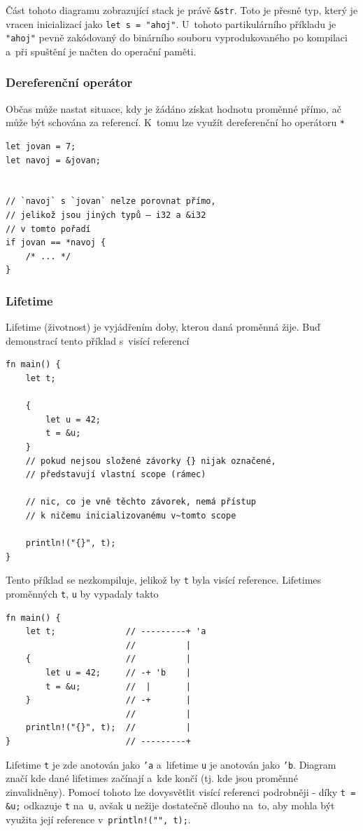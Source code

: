 \documentclass[a4paper, 12pt, twoside]{article} %
\newcommand{\rust}[1]{\texttt{#1}}
\begin{document}
				Část tohoto diagramu zobrazující stack je právě \rust{&str}. Toto je přesně typ, který je vracen inicializací jako \rust{let s = "ahoj"}. U~tohoto partikulárního příkladu je \rust{"ahoj"} pevně zakódovaný do binárního souboru vyprodukovaného po kompilaci a~při spuštění je načten do operační paměti.

			\subsubsection*{Dereferenční operátor}
				Občas může nastat situace, kdy je žádáno získat hodnotu proměnné přímo, ač může být schována za referencí. K~tomu lze využít dereferenční ho operátoru \rust{*}
				\begin{verbatim} 
let jovan = 7;
let navoj = &jovan;


// `navoj` s `jovan` nelze porovnat přímo,
// jelikož jsou jiných typů — i32 a &i32
// v tomto pořadí
if jovan == *navoj {
	/* ... */
}
				\end{verbatim}
		
			\subsubsection*{Lifetime}
				Lifetime (životnost) je vyjádřením doby, kterou daná proměnná žije. Buď demonstrací tento příklad s~visící referencí
				\begin{verbatim}
fn main() {
	let t;

	{
		let u = 42;
		t = &u;
	}
	// pokud nejsou složené závorky {} nijak označené,
	// představují vlastní scope (rámec)

	// nic, co je vně těchto závorek, nemá přístup
	// k ničemu inicializovanému v~tomto scope

	println!("{}", t);
}
				\end{verbatim}
				
				Tento příklad se nezkompiluje, jelikož by \rust{t} byla visící reference. Lifetimes proměnných \rust{t}, \rust{u} by vypadaly takto
				\begin{verbatim}
fn main() {
	let t;              // ---------+ 'a
						//          |
	{                   //          |
		let u = 42;     // -+ 'b    |
		t = &u;         //  |       |
	}                   // -+       |
						//          |
	println!("{}", t);  //          |
}                       // ---------+
			\end{verbatim}
			
				Lifetime \rust{t} je zde anotován jako \rust{'a} a~lifetime \rust{u} je anotován jako \rust{'b}. Diagram značí kde dané lifetimes začínají a~kde končí (tj. kde jsou proměnné zinvalidněny). Pomocí tohoto lze dovysvětlit visící referenci podrobněji - díky \rust{t = &u;} odkazuje \rust{t} na~\rust{u}, avšak \rust{u} nežije dostatečně dlouho na~to, aby mohla být využita její reference v~\rust{println!("{}", t);}.
				
\end{document}
